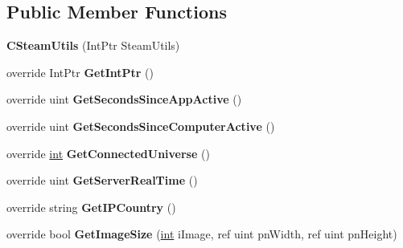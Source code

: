 \subsection*{Public Member Functions}
\begin{DoxyCompactItemize}
\item 
\hypertarget{classValve_1_1Steamworks_1_1CSteamUtils_aecd1b401049d056ea4ece16a5141cd05}{}{\bfseries C\+Steam\+Utils} (Int\+Ptr Steam\+Utils)\label{classValve_1_1Steamworks_1_1CSteamUtils_aecd1b401049d056ea4ece16a5141cd05}

\item 
\hypertarget{classValve_1_1Steamworks_1_1CSteamUtils_a40436b09ceb6ac65adcdc56c8d80c374}{}override Int\+Ptr {\bfseries Get\+Int\+Ptr} ()\label{classValve_1_1Steamworks_1_1CSteamUtils_a40436b09ceb6ac65adcdc56c8d80c374}

\item 
\hypertarget{classValve_1_1Steamworks_1_1CSteamUtils_ab8907dfbe02bbacce06b7010d2ae622f}{}override uint {\bfseries Get\+Seconds\+Since\+App\+Active} ()\label{classValve_1_1Steamworks_1_1CSteamUtils_ab8907dfbe02bbacce06b7010d2ae622f}

\item 
\hypertarget{classValve_1_1Steamworks_1_1CSteamUtils_a7986676d7ff0bf59647092b867b67a98}{}override uint {\bfseries Get\+Seconds\+Since\+Computer\+Active} ()\label{classValve_1_1Steamworks_1_1CSteamUtils_a7986676d7ff0bf59647092b867b67a98}

\item 
\hypertarget{classValve_1_1Steamworks_1_1CSteamUtils_a3e5ac0777d8bfaab0335cabf27b106c8}{}override \hyperlink{SDL__thread_8h_a6a64f9be4433e4de6e2f2f548cf3c08e}{int} {\bfseries Get\+Connected\+Universe} ()\label{classValve_1_1Steamworks_1_1CSteamUtils_a3e5ac0777d8bfaab0335cabf27b106c8}

\item 
\hypertarget{classValve_1_1Steamworks_1_1CSteamUtils_adfb530df3f15b17fbcf9554c8b8c1a31}{}override uint {\bfseries Get\+Server\+Real\+Time} ()\label{classValve_1_1Steamworks_1_1CSteamUtils_adfb530df3f15b17fbcf9554c8b8c1a31}

\item 
\hypertarget{classValve_1_1Steamworks_1_1CSteamUtils_a93bd61a16367af1caa5e23cbe259e725}{}override string {\bfseries Get\+I\+P\+Country} ()\label{classValve_1_1Steamworks_1_1CSteamUtils_a93bd61a16367af1caa5e23cbe259e725}

\item 
\hypertarget{classValve_1_1Steamworks_1_1CSteamUtils_a68ff1b628a73935b27b62f8c00ef3129}{}override bool {\bfseries Get\+Image\+Size} (\hyperlink{SDL__thread_8h_a6a64f9be4433e4de6e2f2f548cf3c08e}{int} i\+Image, ref uint pn\+Width, ref uint pn\+Height)\label{classValve_1_1Steamworks_1_1CSteamUtils_a68ff1b628a73935b27b62f8c00ef3129}


\end{DoxyCompactItemize}
